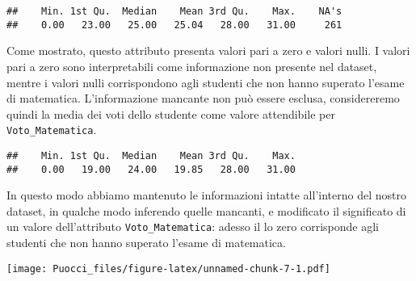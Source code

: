 \documentclass[
]{article}
\newenvironment{Shaded}{\begin{snugshade}}{\end{snugshade}}
\newcommand{\DecValTok}[1]{\textcolor[rgb]{0.00,0.00,0.81}{#1}}
\newcommand{\KeywordTok}[1]{\textcolor[rgb]{0.13,0.29,0.53}{\textbf{#1}}}
\newcommand{\NormalTok}[1]{#1}
\newcommand{\OperatorTok}[1]{\textcolor[rgb]{0.81,0.36,0.00}{\textbf{#1}}}
\newcommand{\StringTok}[1]{\textcolor[rgb]{0.31,0.60,0.02}{#1}}
\begin{document}
\begin{verbatim}
##    Min. 1st Qu.  Median    Mean 3rd Qu.    Max.    NA's 
##    0.00   23.00   25.00   25.04   28.00   31.00     261
\end{verbatim}

Come mostrato, questo attributo presenta valori pari a zero e valori
nulli. I valori pari a zero sono interpretabili come informazione non
presente nel dataset, mentre i valori nulli corrispondono agli studenti
che non hanno superato l'esame di matematica. L'informazione mancante
non può essere esclusa, considereremo quindi la media dei voti dello
studente come valore attendibile per \texttt{Voto\_Matematica}.

\begin{Shaded}
\end{Shaded}

\begin{verbatim}
##    Min. 1st Qu.  Median    Mean 3rd Qu.    Max. 
##    0.00   19.00   24.00   19.85   28.00   31.00
\end{verbatim}

In questo modo abbiamo mantenuto le informazioni intatte all'interno del
nostro dataset, in qualche modo inferendo quelle mancanti, e modificato
il significato di un valore dell'attributo \texttt{Voto\_Matematica}:
adesso il lo zero corrisponde agli studenti che non hanno superato
l'esame di matematica.

\texttt{[image: Puocci\_files/figure-latex/unnamed-chunk-7-1.pdf]}
\end{document}
